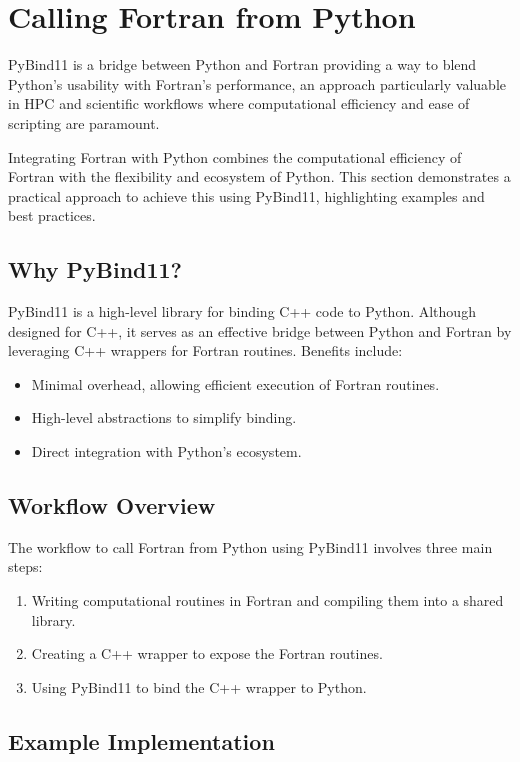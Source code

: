 % 

\section{Calling Fortran from Python}
PyBind11 is a bridge between Python and Fortran providing a way to blend Python's usability with Fortran's performance, an approach particularly valuable in HPC and scientific workflows where computational efficiency and ease of scripting are paramount.

Integrating Fortran with Python combines the computational efficiency of Fortran with the flexibility and ecosystem of Python. This section demonstrates a practical approach to achieve this using PyBind11, highlighting examples and best practices.

\subsection{Why PyBind11?}
PyBind11 is a high-level library for binding C++ code to Python. Although designed for C++, it serves as an effective bridge between Python and Fortran by leveraging C++ wrappers for Fortran routines. Benefits include:
\begin{itemize}
    \item Minimal overhead, allowing efficient execution of Fortran routines.
    \item High-level abstractions to simplify binding.
    \item Direct integration with Python's ecosystem.
\end{itemize}

\subsection{Workflow Overview}
The workflow to call Fortran from Python using PyBind11 involves three main steps:
\begin{enumerate}
    \item Writing computational routines in Fortran and compiling them into a shared library.
    \item Creating a C++ wrapper to expose the Fortran routines.
    \item Using PyBind11 to bind the C++ wrapper to Python.
\end{enumerate}

\subsection{Example Implementation}
